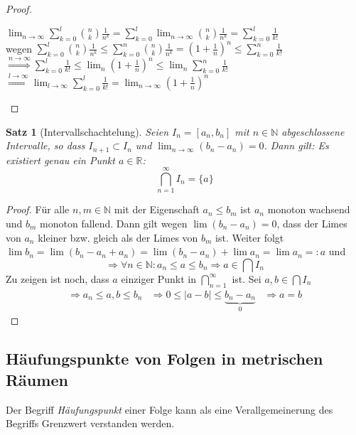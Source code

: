 \documentclass[ngerman,titlepage,twoside, parskip=half*]{scrreprt}
\newcommand*{\N}{\mathbb{N}}
\newcommand*{\R}{\mathbb{R}}
\theoremstyle{plain}
\newtheorem{theorem}{Satz}[section]
\theoremstyle{definition}
\theoremstyle{remark}
\begin{document}
\begin{proof}
\begin{enumerate}
    $\lim_{n \rightarrow \infty} \sum_{k=0}^l \binom{n}{k} \frac{1}{n^k}
    = \sum_{k=0}^l \lim_{n \rightarrow \infty} \binom{n}{k} \frac{1}{n^k} = 
    \sum_{k=0}^l \frac{1}{k!}$\\
    wegen $\sum_{k=0}^l \binom{n}{k} \frac{1}{n^k}
    \leq \sum_{k=0}^n \binom{n}{k} \frac{1}{n^k}=\left( 1+\frac{1}{n}\right)^n
    \leq \sum_{k=0}^n \frac{1}{k!}$\\
    $\overset{n \rightarrow \infty}{\Rightarrow}\sum_{k=0}^l \frac{1}{k!} \leq
    \lim_n \left(1+\frac{1}{n}\right)^n \leq \lim_n \sum_{k=0}^n \frac{1}{k!}$\\
    $\overset{l \rightarrow \infty}{\Rightarrow} \lim_{l \rightarrow \infty}
    \sum_{k=0}^l \frac{1}{k!} = \lim_{n \rightarrow \infty} \left(1+\frac{1}{n}
    \right)^n$
\end{enumerate}
\end{proof}

\begin{theorem}[Intervallschachtelung]
  \label{satz:Ischachtelung}
  Seien $I_n=[a_n,b_n]$ mit $n \in \N$ abgeschlossene Intervalle, so
  dass $I_{n+1} \subset I_n$ und $\lim_{n \rightarrow \infty}
  (b_n-a_n)=0$. Dann gilt: Es existiert genau ein Punkt $a \in \R$:
  \[\bigcap_{n=1}^{\infty} I_n = \{a\}\]
\end{theorem}
\begin{proof}
  Für alle $n,m \in \N$ mit der Eigenschaft $a_n \leq b_m$ ist $a_n $
  monoton wachsend und $b_m$ monoton fallend. Dann gilt wegen $\lim
  (b_n-a_n)=0$, dass der Limes von $a_n$ kleiner bzw. gleich als der
  Limes von $b_m$ ist. Weiter folgt $\lim b_n = \lim
  (b_n-a_n+a_n)=\lim(b_n-a_n)+\lim a_n=\lim a_n=:a$ und
  \[\Rightarrow \forall n \in \N \colon a_n \leq a \leq b_n \Rightarrow a \in
  \bigcap I_n\]
  Zu zeigen ist noch, dass $a$ einziger Punkt in
  $\bigcap_{n=1}^\infty$ ist. Sei $a,b \in \bigcap I_n$
\begin{align*}
  \Rightarrow a_n \leq a,b \leq b_n & \Rightarrow 0 \leq |a-b| \leq
  \underbrace{b_n-a_n}_{0} & \Rightarrow a = b
\end{align*}
\end{proof}

\subsection{Häufungspunkte von Folgen in metrischen Räumen}

Der Begriff \emph{Häufungspunkt} einer Folge kann
als eine Verallgemeinerung des Begriffs Grenzwert verstanden werden.
\end{document}
